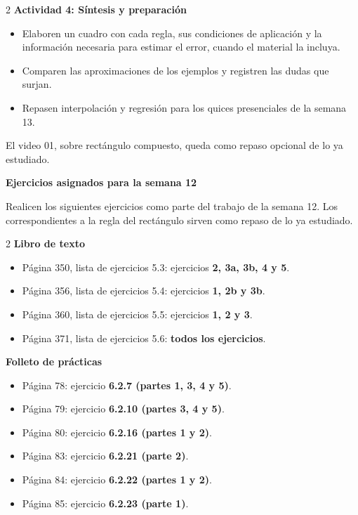 \documentclass[10pt,letterpaper]{article}
\begin{document}
\begin{multicols}{2}
{\color{actividades}\textbf{Actividad 4: Síntesis y preparación}}
\begin{itemize}
\item Elaboren un cuadro con cada regla, sus condiciones de aplicación y la información necesaria para estimar el error, cuando el material la incluya.
\item Comparen las aproximaciones de los ejemplos y registren las dudas que surjan.
\item Repasen interpolación y regresión para los quices presenciales de la semana 13.
\end{itemize}
El video 01, sobre rectángulo compuesto, queda como repaso opcional de lo ya estudiado.
\end{multicols}

\newpage
{\color{titulos}\Large\textbf{Ejercicios asignados para la semana 12}}

Realicen los siguientes ejercicios como parte del trabajo de la semana 12. Los correspondientes a la regla del rectángulo sirven como repaso de lo ya estudiado.

\begin{multicols}{2}
{\color{actividades}\textbf{Libro de texto}}
\begin{itemize}
\item Página 350, lista de ejercicios 5.3: ejercicios \textbf{2, 3a, 3b, 4 y 5}.
\item Página 356, lista de ejercicios 5.4: ejercicios \textbf{1, 2b y 3b}.
\item Página 360, lista de ejercicios 5.5: ejercicios \textbf{1, 2 y 3}.
\item Página 371, lista de ejercicios 5.6: \textbf{todos los ejercicios}.
\end{itemize}

\columnbreak
{\color{actividades}\textbf{Folleto de prácticas}}
\begin{itemize}
\item Página 78: ejercicio \textbf{6.2.7 (partes 1, 3, 4 y 5)}.
\item Página 79: ejercicio \textbf{6.2.10 (partes 3, 4 y 5)}.
\item Página 80: ejercicio \textbf{6.2.16 (partes 1 y 2)}.
\item Página 83: ejercicio \textbf{6.2.21 (parte 2)}.
\item Página 84: ejercicio \textbf{6.2.22 (partes 1 y 2)}.
\item Página 85: ejercicio \textbf{6.2.23 (parte 1)}.
\end{itemize}
\end{multicols}
\end{document}

